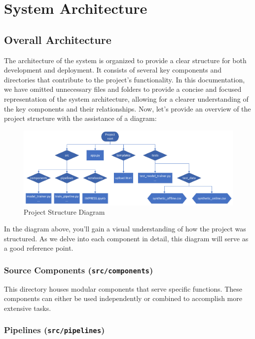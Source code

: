 \documentclass{report}
\begin{document}
\chapter{System Architecture}
\section{Overall Architecture}

The architecture of the system is organized to provide a clear structure for both development and deployment. It consists of several key components and directories that contribute to the project's functionality. In this documentation, we have omitted unnecessary files and folders to provide a concise and focused representation of the system architecture, allowing for a clearer understanding of the key components and their relationships.
Now, let's provide an overview of the project structure with the assistance of a diagram:

\begin{figure}[h]
\centering
\includegraphics[width=\textwidth]{System_architecture.png}
\caption{Project Structure Diagram}
\label{fig:system-architecture}
\end{figure}

In the diagram above, you'll gain a visual understanding of how the project was structured. As we delve into each component in detail, this diagram will serve as a good reference point.
\subsection{Source Components (\texttt{src/components})}

This directory houses modular components that serve specific functions. These components can either be used independently or combined to accomplish more extensive tasks.

\subsection{Pipelines (\texttt{src/pipelines})}
\end{document}
